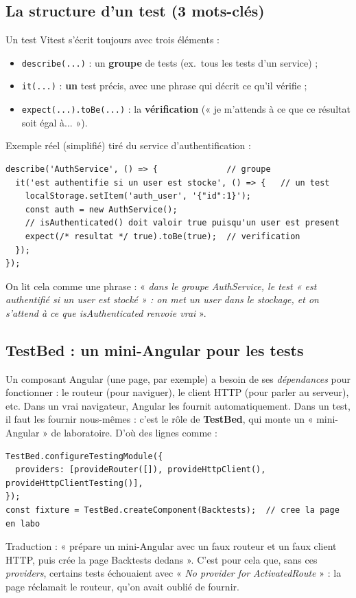 \documentclass[11pt,a4paper]{article}
\newcommand{\code}[1]{\texttt{#1}}
\begin{document}
\subsection{La structure d'un test (3 mots-clés)}
Un test Vitest s'écrit toujours avec trois éléments :
\begin{itemize}[leftmargin=1.4em,nosep]
  \item \code{describe(...)} : un \textbf{groupe} de tests (ex.\ tous les tests
        d'un service) ;
  \item \code{it(...)} : \textbf{un} test précis, avec une phrase qui décrit ce
        qu'il vérifie ;
  \item \code{expect(...).toBe(...)} : la \textbf{vérification} (« je m'attends à
        ce que ce résultat soit égal à... »).
\end{itemize}

Exemple réel (simplifié) tiré du service d'authentification :
\begin{lstlisting}
describe('AuthService', () => {              // groupe
  it('est authentifie si un user est stocke', () => {   // un test
    localStorage.setItem('auth_user', '{"id":1}');
    const auth = new AuthService();
    // isAuthenticated() doit valoir true puisqu'un user est present
    expect(/* resultat */ true).toBe(true);  // verification
  });
});
\end{lstlisting}
On lit cela comme une phrase : « \emph{dans le groupe AuthService, le test « est
authentifié si un user est stocké » : on met un user dans le stockage, et on
s'attend à ce que isAuthenticated renvoie vrai} ».

\subsection{TestBed : un mini-Angular pour les tests}
Un composant Angular (une page, par exemple) a besoin de ses \emph{dépendances}
pour fonctionner : le routeur (pour naviguer), le client HTTP (pour parler au
serveur), etc. Dans un vrai navigateur, Angular les fournit automatiquement. Dans
un test, il faut les fournir nous-mêmes : c'est le rôle de \textbf{TestBed}, qui
monte un « mini-Angular » de laboratoire. D'où des lignes comme :
\begin{lstlisting}
TestBed.configureTestingModule({
  providers: [provideRouter([]), provideHttpClient(), provideHttpClientTesting()],
});
const fixture = TestBed.createComponent(Backtests);  // cree la page en labo
\end{lstlisting}
Traduction : « prépare un mini-Angular avec un faux routeur et un faux client
HTTP, puis crée la page Backtests dedans ». C'est pour cela que, sans ces
\emph{providers}, certains tests échouaient avec « \emph{No provider for
ActivatedRoute} » : la page réclamait le routeur, qu'on avait oublié de fournir.
\end{document}

